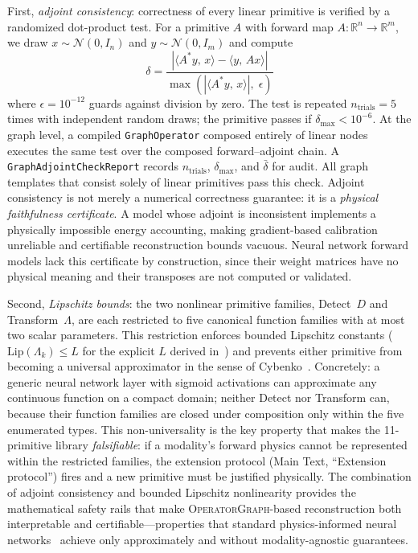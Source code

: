 \documentclass[11pt]{article}
\newcommand{\opg}{\textsc{OperatorGraph}}
\begin{document}
First, \emph{adjoint consistency}: correctness of every linear primitive
is verified by a randomized dot-product test.  For a primitive $A$ with
forward map $A:\mathbb{R}^n \to \mathbb{R}^m$, we draw $x \sim \mathcal{N}(0,I_n)$
and $y \sim \mathcal{N}(0,I_m)$ and compute
\begin{equation}
  \delta = \frac{|\langle A^* y,\, x \rangle - \langle y,\, Ax \rangle|}
               {\max(|\langle A^* y,\, x \rangle|,\; \epsilon)}
  \label{eq:adjoint_check}
\end{equation}
where $\epsilon = 10^{-12}$ guards against division by zero.  The test
is repeated $n_{\text{trials}} = 5$ times with independent random draws;
the primitive passes if $\delta_{\max} < 10^{-6}$.  At the graph level,
a compiled \texttt{GraphOperator} composed entirely of linear nodes
executes the same test over the composed forward--adjoint chain.  A
\texttt{GraphAdjointCheckReport} records $n_{\text{trials}}$,
$\delta_{\max}$, and $\bar\delta$ for audit.  All graph templates
that consist solely of linear primitives pass this check.
Adjoint consistency is not merely a numerical correctness guarantee: it
is a \emph{physical faithfulness certificate}.  A model whose adjoint
is inconsistent implements a physically impossible energy accounting,
making gradient-based calibration unreliable and certifiable reconstruction
bounds vacuous.  Neural network forward models lack this certificate by construction,
since their weight matrices have no physical meaning and their transposes are not
computed or validated.

Second, \emph{Lipschitz bounds}: the two nonlinear primitive families,
Detect~$D$ and Transform~$\Lambda$, are each restricted to five canonical
function families with at most two scalar parameters.  This restriction
enforces bounded Lipschitz constants ($\mathrm{Lip}(\Lambda_k) \leq L$ for
the explicit $L$ derived in~\cite{yang2026fpt}) and prevents either primitive
from becoming a universal approximator in the sense of Cybenko~\cite{cybenko1989approximation}.
Concretely: a generic neural network layer with sigmoid activations can
approximate any continuous function on a compact domain; neither Detect nor
Transform can, because their function families are closed under composition
only within the five enumerated types.  This non-universality is the key
property that makes the 11-primitive library \emph{falsifiable}: if a
modality's forward physics cannot be represented within the restricted
families, the extension protocol (Main Text, ``Extension protocol'') fires
and a new primitive must be justified physically.  The combination of
adjoint consistency and bounded Lipschitz nonlinearity provides the
mathematical safety rails that make \opg{}-based reconstruction both
interpretable and certifiable---properties that standard physics-informed
neural networks~\cite{raissi2019pinn} achieve only approximately and
without modality-agnostic guarantees.
\end{document}

